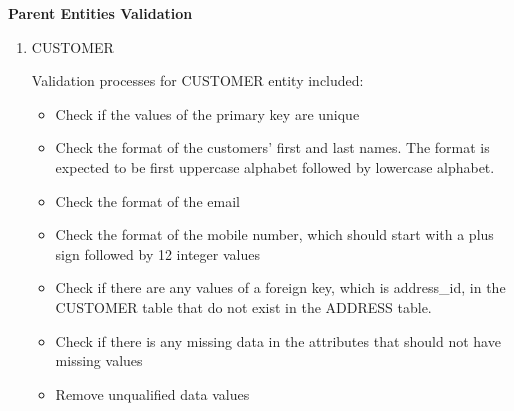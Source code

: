 \documentclass[
  letterpaper,
  DIV=11,
  numbers=noendperiod]{scrartcl}
\newenvironment{Shaded}{\begin{snugshade}}{\end{snugshade}}
\newcommand{\CommentTok}[1]{\textcolor[rgb]{0.37,0.37,0.37}{#1}}
\newcommand{\FunctionTok}[1]{\textcolor[rgb]{0.28,0.35,0.67}{#1}}
\newcommand{\NormalTok}[1]{\textcolor[rgb]{0.00,0.23,0.31}{#1}}
\newcommand{\OtherTok}[1]{\textcolor[rgb]{0.00,0.23,0.31}{#1}}
\newcommand{\SpecialCharTok}[1]{\textcolor[rgb]{0.37,0.37,0.37}{#1}}
\newcommand{\StringTok}[1]{\textcolor[rgb]{0.13,0.47,0.30}{#1}}
\begin{document}
\textbf{Parent Entities Validation}

\begin{enumerate}
\def\labelenumi{\arabic{enumi}.}
\item
  CUSTOMER

  Validation processes for CUSTOMER entity included:

  \begin{itemize}
  \item
    Check if the values of the primary key are unique
  \item
    Check the format of the customers' first and last names. The format
    is expected to be first uppercase alphabet followed by lowercase
    alphabet.
  \item
    Check the format of the email
  \item
    Check the format of the mobile number, which should start with a
    plus sign followed by 12 integer values
  \item
    Check if there are any values of a foreign key, which is
    address\_id, in the CUSTOMER table that do not exist in the ADDRESS
    table.
  \item
    Check if there is any missing data in the attributes that should not
    have missing values
  \item
    Remove unqualified data values
  \end{itemize}

\begin{Shaded}
\end{Shaded}
\end{enumerate}
\end{document}
